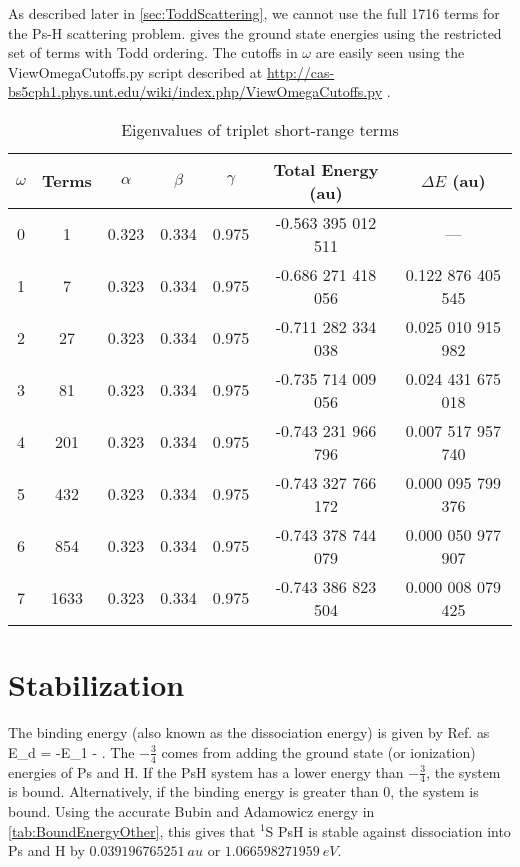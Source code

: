 \documentclass[Dissertation.tex]{subfiles}
\begin{document}
As described later in \cref{sec:ToddScattering}, we cannot use the full 1716 terms for the Ps-H scattering problem.  gives the ground state energies using the restricted set of terms with Todd ordering. The cutoffs in $\omega$ are easily seen using the ViewOmegaCutoffs.py script described at \url{http://cas-bs5cph1.phys.unt.edu/wiki/index.php/ViewOmegaCutoffs.py} \cite{Wiki}.

\setlength{\abovecaptionskip}{6pt}   %
\setlength{\belowcaptionskip}{6pt}   %
\begin{table}[H]
\centering
\begin{tabular}{c c c c c c c}
\toprule
$\omega$ & Terms & $\alpha$ & $\beta$ & $\gamma$ & Total Energy (au) & $\Delta E$ (au) \\ [0.5ex]
\midrule
0 & 1    & 0.323 & 0.334 & 0.975 & -0.563 395 012 511 & --- \\
1 & 7    & 0.323 & 0.334 & 0.975 & -0.686 271 418 056 & 0.122 876 405 545 \\
2 & 27   & 0.323 & 0.334 & 0.975 & -0.711 282 334 038 & 0.025 010 915 982 \\
3 & 81   & 0.323 & 0.334 & 0.975 & -0.735 714 009 056 & 0.024 431 675 018 \\
4 & 201  & 0.323 & 0.334 & 0.975 & -0.743 231 966 796 & 0.007 517 957 740 \\
5 & 432  & 0.323 & 0.334 & 0.975 & -0.743 327 766 172 & 0.000 095 799 376 \\
6 & 854  & 0.323 & 0.334 & 0.975 & -0.743 378 744 079 & 0.000 050 977 907 \\
7 & 1633 & 0.323 & 0.334 & 0.975 & -0.743 386 823 504 & 0.000 008 079 425 \\
\bottomrule
\end{tabular}
\caption{Eigenvalues of triplet short-range terms}
\label{tab:BoundEnergyTodd3}
\end{table}


\section{Stabilization}


The binding energy (also known as the dissociation energy) is given by Ref. \cite{Page1974} as
\beq
\label{eq:DissociationE}
E_d = -E_1 -  .
\eeq
The $-\frac{3}{4}$ comes from adding the ground state (or ionization) energies of Ps and H. If the PsH system has a lower energy than $-\frac{3}{4}$, the system is bound. 
Alternatively, if the binding energy is greater than 0, the system is bound.
Using the accurate Bubin and Adamowicz energy in \cref{tab:BoundEnergyOther}, this gives that $^1$S PsH is stable against dissociation into Ps and H by $\SI{0.039 196 765 251}{au}$ or $\SI{1.066 598 271 959}{eV}$. 
\end{document}
